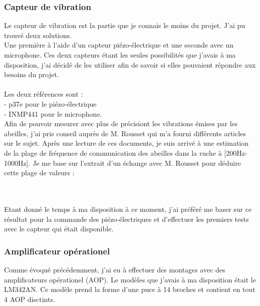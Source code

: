 \documentclass[12pt,french,a4paper]{article}
\begin{document}
\subsubsection{Capteur de vibration}
Le capteur de vibration est la partie que je connais le moins du projet. J'ai pu trouvé deux solutions.\\
 Une première à l'aide d'un capteur piézo-électrique et une seconde avec un  microphone. Ces deux capteurs étant les seules possibilités que j'avais à ma disposition, 
 j'ai décidé de les utiliser afin de savoir si elles pouvaient répondre aux besoins du projet.\\
\\
 Les deux références sont :\\
- p37e pour le piézo-électrique\\
- INMP441 pour le microphone.\\

Afin de pouvoir mesurer avec plus de précisiont les vibrations émises par les abeilles, j'ai pris conseil auprès de M. Rousset qui m'a fourni différents articles sur le sujet.
Après une lecture de ces documents, je suis arrivé à une estimation de la plage de fréquence de communication des abeilles dans la ruche à [200Hz-1000Hz]. Je me base sur l'extrait d'un échange avec M. Rousset pour déduire cette plage de valeurs : \\ 
\\
\\


Etant donné le temps à ma disposition à ce moment, j'ai préféré me baser sur ce résultat pour la commande des piézo-électriques et d'effectuer les premiers tests avec le capteur qui était disponible. 

\subsubsection{Amplificateur opérationel} 
Comme évoqué précédemment, j'ai eu à effectuer des montages avec des amplificateurs opérationel (AOP). Le modèles que j'avais à ma disposition était le LM342AN. Ce modèle prend la forme d'une puce à 14 broches et contient en tout 4 AOP disctints. 
\end{document}
